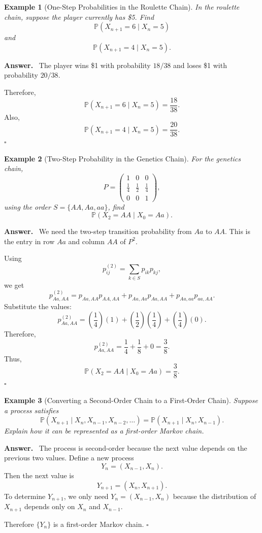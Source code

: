 \documentclass[12pt,a4paper]{article}
\theoremstyle{lecturestyle}
\newtheorem{example}{Example}
\newenvironment{answer}
{\par\textbf{Answer.}\ }
{\hfill$\square$\par}
\newcommand{\Prob}{\mathbb{P}}
\begin{document}
\begin{example}[One-Step Probabilities in the Roulette Chain]
In the roulette chain, suppose the player currently has \$5. Find
\[
\Prob(X_{n+1}=6\mid X_n=5)
\]
and
\[
\Prob(X_{n+1}=4\mid X_n=5).
\]
\end{example}

\begin{answer}
The player wins \$1 with probability $18/38$ and loses \$1 with probability $20/38$.

Therefore,
\[
\Prob(X_{n+1}=6\mid X_n=5)=\frac{18}{38}.
\]
Also,
\[
\Prob(X_{n+1}=4\mid X_n=5)=\frac{20}{38}.
\]
\end{answer}

\begin{example}[Two-Step Probability in the Genetics Chain]
For the genetics chain,
\[
P=
\begin{pmatrix}
1 & 0 & 0\\
\frac14 & \frac12 & \frac14\\
0 & 0 & 1
\end{pmatrix},
\]
using the order $S=\{AA,Aa,aa\}$, find
\[
\Prob(X_2=AA\mid X_0=Aa).
\]
\end{example}

\begin{answer}
We need the two-step transition probability from $Aa$ to $AA$. This is the entry in row $Aa$ and column $AA$ of $P^2$.

Using
\[
p_{ij}^{(2)}=\sum_{k\in S}p_{ik}p_{kj},
\]
we get
\[
p_{Aa,AA}^{(2)}
=p_{Aa,AA}p_{AA,AA}
+p_{Aa,Aa}p_{Aa,AA}
+p_{Aa,aa}p_{aa,AA}.
\]
Substitute the values:
\[
p_{Aa,AA}^{(2)}
=\left(\frac14\right)(1)
+\left(\frac12\right)\left(\frac14\right)
+\left(\frac14\right)(0).
\]
Therefore,
\[
p_{Aa,AA}^{(2)}
=\frac14+\frac18+0
=\frac38.
\]
Thus,
\[
\Prob(X_2=AA\mid X_0=Aa)=\frac38.
\]
\end{answer}

\begin{example}[Converting a Second-Order Chain to a First-Order Chain]
Suppose a process satisfies
\[
\Prob(X_{n+1}\mid X_n,X_{n-1},X_{n-2},\ldots)
=\Prob(X_{n+1}\mid X_n,X_{n-1}).
\]
Explain how it can be represented as a first-order Markov chain.
\end{example}

\begin{answer}
The process is second-order because the next value depends on the previous two values. Define a new process
\[
Y_n=(X_{n-1},X_n).
\]
Then the next value is
\[
Y_{n+1}=(X_n,X_{n+1}).
\]
To determine $Y_{n+1}$, we only need $Y_n=(X_{n-1},X_n)$ because the distribution of $X_{n+1}$ depends only on $X_n$ and $X_{n-1}$.

Therefore $\{Y_n\}$ is a first-order Markov chain.
\end{answer}
\end{document}
